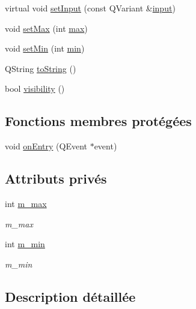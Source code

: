 \begin{DoxyCompactItemize}
\item 
virtual void \hyperlink{classSH__QuestionState_a331222d371d9c97392f35c84a5ef43e1}{set\-Input} (const Q\-Variant \&\hyperlink{classSH__InOutState_a04364c76d2fd8a3781e7b325955e5bd9}{input})
\item 
void \hyperlink{classSH__NumericQuestionState_aced35da171964ceffc22ed7d6f6a7a9f}{set\-Max} (int \hyperlink{classSH__NumericQuestionState_ac042a94900f79aba298fb013e3ec059b}{max})
\item 
void \hyperlink{classSH__NumericQuestionState_a62180ba1751ef8e523cb1e73c58b3ab6}{set\-Min} (int \hyperlink{classSH__NumericQuestionState_a5acb66d7a0365c9850195e5b9a2d5145}{min})
\item 
Q\-String \hyperlink{classSH__GenericState_a5480c5ee725fd801d8f6292cd4c803b8}{to\-String} ()
\item 
bool \hyperlink{classSH__InOutState_a8c496b2fe21a51a587c6e4409c0f37ec}{visibility} ()
\end{DoxyCompactItemize}
\subsection*{Fonctions membres protégées}
\begin{DoxyCompactItemize}
\item 
void \hyperlink{classSH__GenericState_a7c30692635023ce7cf65e5ba5bb18a9c}{on\-Entry} (Q\-Event $\ast$event)
\end{DoxyCompactItemize}
\subsection*{Attributs privés}
\begin{DoxyCompactItemize}
\item 
int \hyperlink{classSH__NumericQuestionState_a7c30cee8a2ff7807e9c9af7916a0ec24}{m\-\_\-max}
\begin{DoxyCompactList}\small\item\em m\-\_\-max \end{DoxyCompactList}\item 
int \hyperlink{classSH__NumericQuestionState_a4e5fe957a054249989acc1efbb79c6d8}{m\-\_\-min}
\begin{DoxyCompactList}\small\item\em m\-\_\-min \end{DoxyCompactList}\end{DoxyCompactItemize}


\subsection{Description détaillée}


